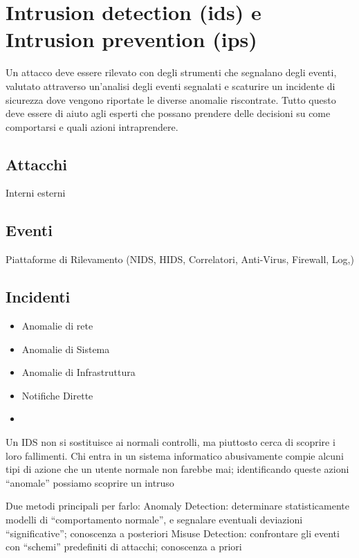 \chapter{Intrusion detection (ids) e Intrusion prevention (ips)}  %

Un attacco deve essere rilevato con degli strumenti che segnalano degli eventi, valutato attraverso un'analisi degli eventi segnalati e scaturire un incidente di sicurezza dove vengono riportate le diverse anomalie riscontrate.
Tutto questo deve essere di aiuto agli esperti che possano prendere delle decisioni su come comportarsi e quali azioni intraprendere.

\section{Attacchi}
Interni
esterni

\section{Eventi}
Piattaforme di Rilevamento
(NIDS, HIDS, Correlatori, Anti-Virus, Firewall, Log,)

\section{Incidenti}

\begin{itemize}
    \item Anomalie di rete
    \item Anomalie di Sistema
    \item Anomalie di Infrastruttura
    \item Notifiche Dirette
    \item 
    
\end{itemize}


Un IDS non si sostituisce ai normali controlli, ma piuttosto cerca di scoprire i loro fallimenti.
Chi entra in un sistema informatico abusivamente compie alcuni tipi di azione che un utente normale non farebbe mai; identificando queste azioni “anomale” possiamo scoprire un intruso

Due metodi principali per farlo:
Anomaly Detection: determinare statisticamente modelli di “comportamento normale”, e segnalare eventuali deviazioni “significative”; conoscenza a posteriori
Misuse Detection: confrontare gli eventi con “schemi” predefiniti di attacchi; conoscenza a priori


